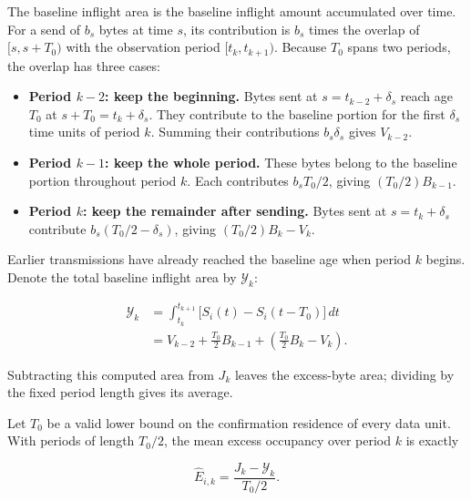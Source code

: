 The baseline inflight area is the baseline inflight amount accumulated over time. For a send of \(b_s\) bytes at time \(s\), its contribution is \(b_s\) times the overlap of \([s,s+T_0)\) with the observation period \([t_k,t_{k+1})\). Because \(T_0\) spans two periods, the overlap has three cases:

\begin{itemize}
\item \textbf{Period \(k-2\): keep the beginning.} Bytes sent at \(s=t_{k-2}+\delta_s\) reach age \(T_0\) at \(s+T_0=t_k+\delta_s\). They contribute to the baseline portion for the first \(\delta_s\) time units of period \(k\). Summing their contributions \(b_s\delta_s\) gives \(V_{k-2}\).
\item \textbf{Period \(k-1\): keep the whole period.} These bytes belong to the baseline portion throughout period \(k\). Each contributes \(b_sT_0/2\), giving \((T_0/2)B_{k-1}\).
\item \textbf{Period \(k\): keep the remainder after sending.} Bytes sent at \(s=t_k+\delta_s\) contribute \(b_s(T_0/2-\delta_s)\), giving \((T_0/2)B_k-V_k\).
\end{itemize}

Earlier transmissions have already reached the baseline age when period \(k\) begins. Denote the total baseline inflight area by \(\mathcal Y_k\):

\begin{equation}
\label{eq:design-13}
\begin{aligned}
\mathcal Y_k
&=\int_{t_k}^{t_{k+1}}\big[S_i(t)-S_i(t-T_0)\big]\,dt\\
&=V_{k-2}+\frac{T_0}{2}B_{k-1}
  +\left(\frac{T_0}{2}B_k-V_k\right).
\end{aligned}
\end{equation}

Subtracting this computed area from \(J_k\) leaves the excess-byte area; dividing by the fixed period length gives its average.

\begin{lemma}
\label{lem:main-2}
Let \(T_0\) be a valid lower bound on the confirmation residence of every data unit. With periods of length \(T_0/2\), the mean excess occupancy over period \(k\) is exactly

\begin{equation}
\label{eq:design-14}
\boxed{\widehat E_{i,k}=\frac{J_k-\mathcal Y_k}{T_0/2}.}
\end{equation}
\end{lemma}

